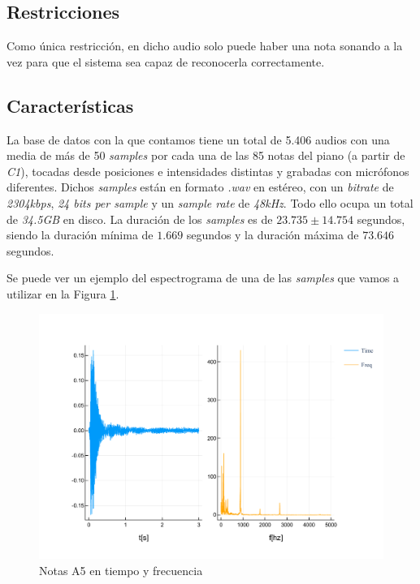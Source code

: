 \documentclass[12pt]{article}
\begin{document}
\newpage
\subsection{Restricciones}
\bigskip
Como única restricción, en dicho audio solo puede haber una nota sonando a la vez para que el sistema sea capaz de reconocerla correctamente.

\subsection{Características}
\bigskip
La base de datos con la que contamos tiene un total de 5.406 audios con una media de más de 50 \textit{samples} por cada una de las 85 notas del piano (a partir de \textit{C1}), tocadas
desde posiciones e intensidades distintas y grabadas con micrófonos diferentes. Dichos \textit{samples} están en formato \textit{.wav} en estéreo, con un 
\textit{bitrate} de \textit{2304kbps}, \textit{24 bits per sample} y un \textit{sample rate} de \textit{48kHz}. Todo ello ocupa un total de \textit{34.5GB} en disco.
La duración de los \textit{samples} es de  $23.735 \pm 14.754$ segundos, siendo la duración mínima
de $1.669$ segundos y la duración máxima de $73.646$ segundos.

Se puede ver un ejemplo del espectrograma de una de las \textit{samples} que vamos a utilizar en la Figura 
\ref{fig:espectro}.

\begin{figure}[!ht]
	\centering
	\includegraphics[width=1.0\linewidth]{assets/A5.pdf}
	\caption{Notas A5 en tiempo y frecuencia}
	\label{fig:espectro}
\end{figure}
\end{document}
